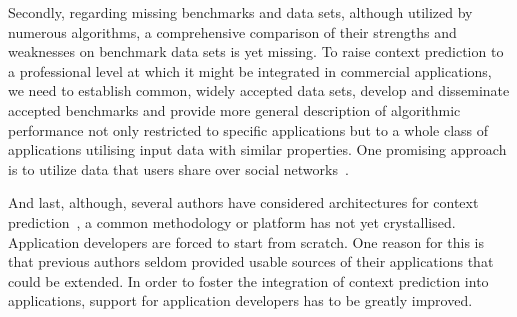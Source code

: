 Secondly, regarding missing benchmarks and data sets, although utilized by numerous algorithms, a comprehensive comparison of their strengths and weaknesses on benchmark data sets is yet missing. 
To raise context prediction to a professional level at which it might be integrated in commercial applications, we need to establish common, widely accepted data sets, develop and disseminate accepted benchmarks and provide more general description of algorithmic performance not only restricted to specific applications but to a whole class of applications utilising input data with similar properties. 
One promising approach is to utilize data that users share over social networks~\cite{Prediction_Zhang_2012}.

And last, although, several authors have considered architectures for context prediction~\cite{5001,4027,5010}, a common methodology or platform has not yet crystallised. 
Application developers are forced to start from scratch. One reason for this is that previous authors seldom provided usable sources of their applications that could be extended. 
In order to foster the integration of context prediction into applications, support for application developers has to be greatly improved. 

\cite{Prediction_Kasteren_2008,Prediction_Tenorth_2009}